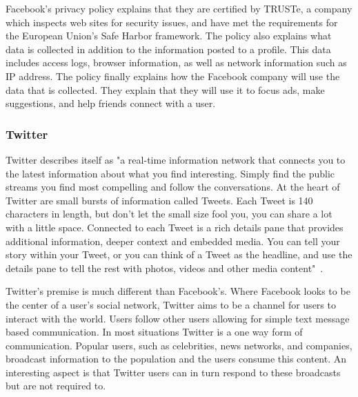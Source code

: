 Facebook's privacy policy explains that they are certified by TRUSTe, a company
which inspects web sites for security issues, and have met
the requirements for the European Union's Safe Harbor framework. The policy also
explains what data is collected in addition to the information posted to a
profile. This data includes access logs, browser information, as well as network
information such as IP address. The policy finally explains how the Facebook
company will use the data that is collected. They explain that they will use it
to focus ads, make suggestions, and help friends connect with a user.


\subsubsection{Twitter} 
Twitter describes itself as "a real-time information network that connects
you to the latest information about what you find interesting. Simply find
the public streams you find most compelling and follow the conversations. At the
heart of Twitter are small bursts of information called Tweets. Each Tweet is
140 characters in length, but don’t let the small size fool you, you can share a
lot with a little space. Connected to each Tweet is a rich details pane that
provides additional information, deeper context and embedded media. You can tell
your story within your Tweet, or you can think of a Tweet as the headline, and
use the details pane to tell the rest with photos, videos and other media
content"~\cite{twabout}.

Twitter's premise is much different than Facebook's. Where Facebook looks to be
the center of a user's social network, Twitter aims to be a channel for users to
interact with the world. Users follow other users allowing for simple text
message based communication. In most situations Twitter is a one way form of
communication. Popular users, such as celebrities, news networks, and companies,
broadcast information to the population and the users consume this content. An
interesting aspect is that Twitter users can in turn respond to these broadcasts
but are not required to.

